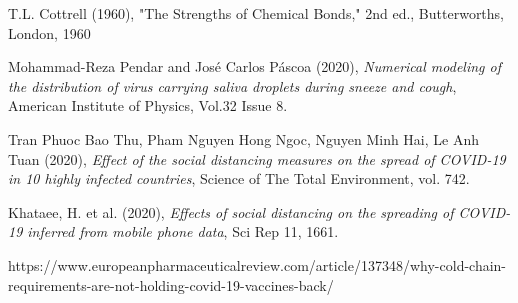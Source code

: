 \documentclass[11pt]{report}
\begin{document}
\begin{thebibliography}{1}
	T.L. Cottrell (1960), "The Strengths of Chemical Bonds," 2nd ed., Butterworths, London, 1960
		
	Mohammad-Reza Pendar and José Carlos Páscoa (2020), \emph{Numerical modeling of the distribution of virus carrying saliva droplets during sneeze and cough}, American Institute of Physics, Vol.32 Issue 8.

    	
	Tran Phuoc Bao Thu, Pham Nguyen Hong Ngoc, Nguyen Minh Hai, Le Anh Tuan (2020), \emph{Effect of the social distancing measures on the spread of COVID-19 in 10 highly infected countries}, Science of The Total Environment, vol. 742.  
		
	Khataee, H. et al. (2020), \emph{Effects of social distancing on the spreading of COVID-19 inferred from mobile phone data}, Sci Rep 11, 1661.
		
    	https://www.europeanpharmaceuticalreview.com/article/137348/why-cold-chain-requirements-are-not-holding-covid-19-vaccines-back/

		
	\end{thebibliography}
	

    
    
    
    
    
	
\end{document}
